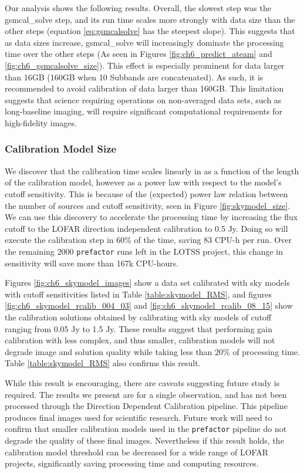 Our analysis shows the following results. Overall, the slowest step was the {\selectfont gsmcal\_solve} step, and its run time scales more strongly with data size than the other steps (equation \ref{eq:gsmcalsolve} has the steepest slope). This suggests that as data sizes increase, {\selectfont gsmcal\_solve} will increasingly dominate the processing time over the other steps (As seen in Figures \ref{fig:ch6_predict_ateam} and \ref{fig:ch6_gsmcalsolve_size}). This effect is especially prominent for data larger than 16GB (160GB when 10 Subbands are concatenated). As such, it is recommended to avoid calibration of data larger than 160GB. This limitation suggests that science requiring operations on non-averaged data sets, such as long-baseline imaging, will require significant computational requirements for high-fidelity images.

\subsubsection{Calibration Model Size}
We discover that the calibration time scales linearly in as a function of the length of the calibration model, however as a power law with respect to the model's cutoff sensitivity. This is because of the (expected) power law relation between the number of sources and cutoff sensitivity, seen in Figure \ref{fig:skymodel_size}. We can use this discovery to accelerate the processing time by increasing the flux cutoff to the LOFAR direction independent calibration to 0.5 Jy. Doing so will execute the calibration step in 60\% of the time, saving 83 CPU-h per run. Over the remaining 2000 \texttt{prefactor} runs left in the LOTSS project, this change in sensitivity will save more than 167k CPU-hours. 

Figures \ref{fig:ch6_skymodel_images} show a data set calibrated with sky models with cutoff sensitivities listed in Table \ref{table:skymodel_RMS}, and figures  \ref{fig:ch6_skymodel_rcalib_004_03} and \ref{fig:ch6_skymodel_rcalib_08_15} show the calibration solutions obtained by calibrating with sky models of cutoff ranging from 0.05 Jy to 1.5 Jy. These results suggest that performing gain calibration with less complex, and thus smaller, calibration models will not degrade image and solution quality while taking less than 20\% of processing time. Table \ref{table:skymodel_RMS} also confirms this result. 

While this result is encouraging, there are caveats suggesting future study is required. The results we present are for a single observation, and has not been processed through the Direction Dependent Calibration pipeline. This pipeline produces final images used for scientific research. Future work will need to confirm that smaller calibration models used in the \texttt{prefactor} pipeline do not degrade the quality of these final images. Nevertheless if this result holds, the calibration model threshold can be decreased for a wide range of LOFAR projects, significantly saving processing time and computing resources. 

